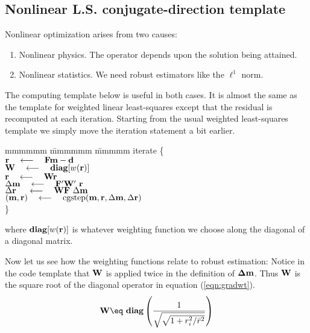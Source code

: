 \subsection{Nonlinear L.S. conjugate-direction template}
Nonlinear optimization
arises from two causes:
\begin{enumerate}
\item
Nonlinear physics. The operator depends upon
the solution being attained.
\item
Nonlinear statistics.  We need robust estimators
like the $\ell^1$ norm.
\end{enumerate}
The computing template below is useful in both cases.
It is almost the same as the template for weighted
linear least-squares except that the residual
is recomputed at each iteration.
Starting from the usual weighted least-squares template
we simply move the iteration statement a bit earlier.
\begin{tabbing}
mmmmmm \= mmmmmm \= mmmmm \kill
\> {\rm iterate \{ }                                                    \\
\>      \> $\bold r \quad\longleftarrow\quad \bold F \bold m - \bold d$                \\
\>      \> $\bold W \quad\longleftarrow\quad {\bf diag}[w(\bold r)]$                    \\
\>      \> $\bold r \quad\longleftarrow\quad \bold W \bold r $                          \\
\>      \>  $\Delta\bold m  \quad\longleftarrow\quad \bold F'\bold W'\         \bold r$ \\
\>      \>  $\Delta\bold r\ \quad\longleftarrow\quad \bold W \bold F \  \Delta \bold m$ \\
\>      \>  $(\bold m,\bold r) \quad\longleftarrow\quad {\rm cgstep}
             (\bold m,\bold r, \Delta\bold m,\Delta\bold r )$ \\
\>      \> \}                                           
\end{tabbing}
where ${\bf diag}[w(\bold r)]$ is whatever weighting function we choose
along the diagonal of a diagonal matrix.
\par
Now let us see how the weighting functions relate
to robust estimation:
Notice in the code template that $\bold W$ is applied twice
in the definition of $\bold \Delta\bold m$.
Thus $\bold W$ is the square root of the diagonal operator
in equation (\ref{eqn:gradwt}).
\begin{equation}
\bold W \eq \ {\bf diag} \left(  {1\over\sqrt{\sqrt{1+r_i^2/\bar r^2}}}  \right)
\label{eqn:fourthroot}
\end{equation}
